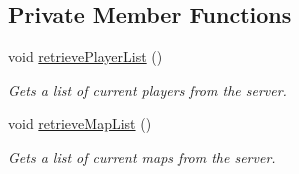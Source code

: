 \subsection*{Private Member Functions}
\begin{DoxyCompactItemize}
\item 
void \hyperlink{classManiaPP_aede94c0b982250de19186d447542e479}{retrieve\-Player\-List} ()
\begin{DoxyCompactList}\small\item\em Gets a list of current players from the server. \end{DoxyCompactList}\item 
void \hyperlink{classManiaPP_a18582fa28b259c22a8a8d526af62123a}{retrieve\-Map\-List} ()
\begin{DoxyCompactList}\small\item\em Gets a list of current maps from the server. \end{DoxyCompactList}\end{DoxyCompactItemize}
